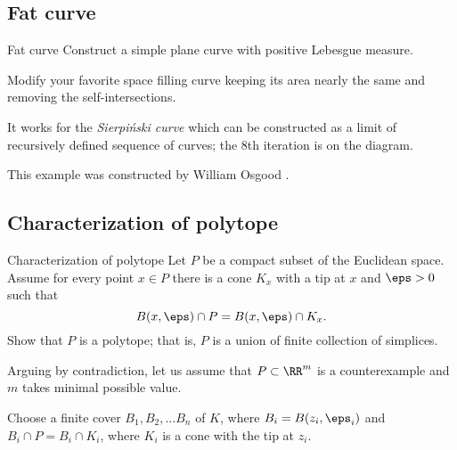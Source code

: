 \subsection*{Fat curve}

\label{Fat curve}

\begin{pr}{\easy}{Fat curve}
Construct a simple plane curve with positive Lebesgue measure.
\end{pr}



Modify your favorite space filling curve 
keeping its area nearly the same 
and removing the self-intersections.

It works for the \emph{Sierpi\'nski curve} 
which can be constructed as a limit of 
recursively defined sequence of curves;
the 8th iteration is on the diagram.\qeds 

This example was constructed 
by William Osgood \cite[see][]{osgood}.









\subsection*{Characterization of polytope}

\begin{pr}{}{Characterization of polytope}
\label{conic neighborhoods}
Let $P$ be a compact subset of the Euclidean space.
Assume for every point $x\in P$
there is a cone $K_x$ with a tip at $x$ and $\eps>0$
such that 
$$B(x,\eps)\cap P
=
B(x,\eps)\cap K_x.$$
Show that $P$ is a polytope; 
that is, $P$ is a union of finite collection of simplices.
\end{pr}
Arguing by contradiction, let us assume that $P\subset \RR^m$
is a counterexample and $m$ takes minimal possible value.

Choose a finite cover $B_1,B_2,\dots B_n$ of $K$,
where $B_i=B(z_i,\eps_i)$ 
and $B_i\cap P=B_i\cap K_i$, 
where $K_i$ is a cone with the tip at $z_i$.

